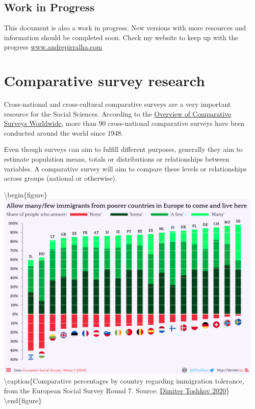 \documentclass[
]{book}
\begin{document}
\hypertarget{work-in-progress}{%
\section{Work in Progress}\label{work-in-progress}}

This document is also a work in progress. New versions with more resources and information should be completed soon. Check my website to keep up with the progress \href{https://andrepirralha.com}{www.andrepirralha.com}

\hypertarget{comp}{%
\chapter{Comparative survey research}\label{comp}}

Cross-national and cross-cultural comparative surveys are a very important resource for the Social Sciences. According to the \href{https://www.gesis.org/angebot/daten-analysieren/weitere-sekundaerdaten/uebersichten/overview-of-comparative-surveys-worldwide}{Overview of Comparative Surveys Worldwide}, more than 90 cross-national comparative surveys have been conducted around the world since 1948.

Even though surveys can aim to fulfill different purposes, generally they aim to estimate population means, totals or distributions or relationships between variables. A comparative survey will aim to compare these levels or relationships across groups (national or otherwise).

\textbackslash begin\{figure\}
\includegraphics[width=0.8\linewidth]{bar_graph} \textbackslash caption\{Comparative percentages by country regarding immigration tolerance, from the European Social Survey Round 7. Source: \href{https://dimiter.eu/Visualizations_files/ESS/Visualizing_ESS_data.html\#saving_the_visualization}{Dimiter Toshkov 2020}\}\label{fig:bar}
\textbackslash end\{figure\}
\end{document}
